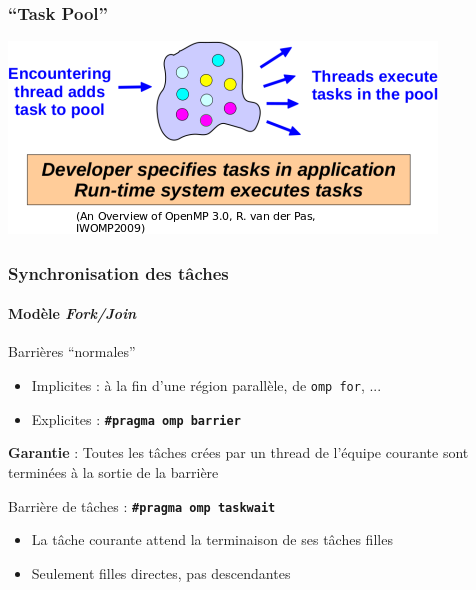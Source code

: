 \documentclass{beamer}
\begin{document}

\begin{frame}
  \frametitle{``Task Pool''}

  \includegraphics[width=\textwidth]{omp_task_pool.png}
\end{frame}



\begin{frame}
  \frametitle{Synchronisation des tâches}
  \framesubtitle{Modèle \emph{Fork/Join}}
  

  \begin{block}{Barrières ``normales''}
    \begin{itemize}
    \item Implicites : à la fin d'une région parallèle, de \texttt{omp for}, ...
    \item Explicites : \texttt{\bf \#pragma omp barrier}
    \end{itemize}

    \medskip
    
    \textbf{Garantie} : Toutes les tâches crées par un thread de l'équipe courante sont
    terminées à la sortie de la barrière
  \end{block}
  
  \bigskip
  
  \begin{exampleblock}{Barrière de tâches : \texttt{\bf \#pragma omp taskwait}}
    \begin{itemize}
    \item La tâche courante attend la terminaison de ses tâches \alert{filles}
    \item Seulement filles directes, pas descendantes
    \end{itemize}
  \end{exampleblock}  
\end{frame}
\end{document}
